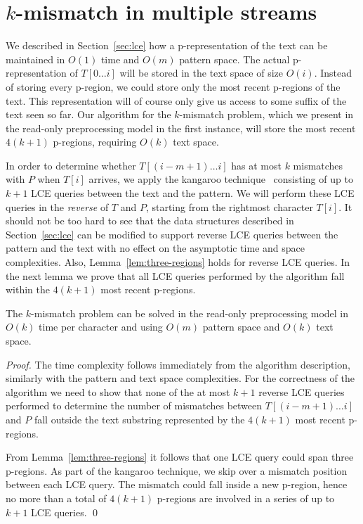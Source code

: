 \documentclass[envcountsame]{llncs}
\newcommand{\upto}{\ensuremath{\ldots}}
\newcommand{\pregion}{\mbox{p-region}\xspace}
\newcommand{\pregions}{\mbox{p-regions}\xspace}
\newcommand{\prepresentation}{\mbox{p-representation}\xspace}
\begin{document}
\section{$k$-mismatch in multiple streams}\label{sec:k-mismatch}

We described in Section~\ref{sec:lce} how a \prepresentation of the
text can be maintained in $O(1)$ time and $O(m)$ pattern space. The
actual \prepresentation of $T[0\upto i]$ will be stored in the text
space of size $O(i)$. Instead of storing every \pregion, we could
store only the most recent \pregions of the text. This representation
will of course only give us access to some suffix of the text seen so
far. Our algorithm for the $k$-mismatch problem, which we present in the read-only preprocessing
model in the first instance, will store the most
recent $4(k+1)$ \pregions, requiring $O(k)$ text space.

In order to determine whether $T[(i-m+1)\upto i]$ has at most $k$ mismatches with $P$ when $T[i]$ arrives, we apply the kangaroo technique~\cite{LV:1985} consisting of up to $k+1$ LCE queries between the text and the pattern. We will perform these LCE queries in the \emph{reverse} of $T$ and $P$, starting from the rightmost character $T[i]$. It should not be too hard to see that the data structures described in Section~\ref{sec:lce} can be modified to support reverse LCE queries between the pattern and the text with no effect on the asymptotic time and space complexities. Also, Lemma~\ref{lem:three-regions} holds for reverse LCE queries. In the next lemma we prove that all LCE queries performed by the algorithm fall within the $4(k+1)$ most recent \pregions.

\begin{lemma}
    \label{lem:k-mismatch}
    The $k$-mismatch problem can be solved in the read-only
    preprocessing model in  $O(k)$ time per character and using $O(m)$ pattern space and $O(k)$ text space.
\end{lemma}
\begin{proof}
    The time complexity follows immediately from the algorithm description, similarly with the pattern and text space complexities. For the correctness of the algorithm we need to show that none of the at most $k+1$ reverse LCE queries performed to determine the number of mismatches between $T[(i-m+1)\upto i]$ and $P$ fall outside the text substring represented by the $4(k+1)$ most recent \pregions.

    From Lemma~\ref{lem:three-regions} it follows that one LCE query could span three \pregions. As part of the kangaroo technique, we skip over a mismatch position between each LCE query. The mismatch could fall inside a new \pregion, hence no more than a total of $4(k+1)$ \pregions are involved in a series of up to $k+1$ LCE queries.
    \qed
\end{proof}
\end{document}
